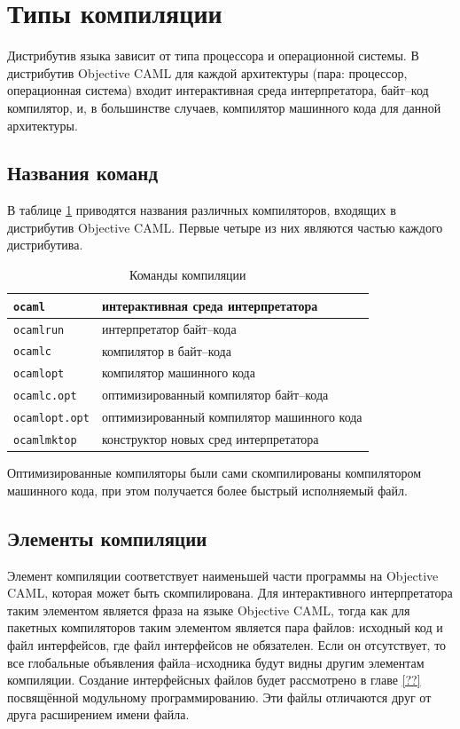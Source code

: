 \section{Типы компиляции}
\label{sec:compilation}

Дистрибутив языка зависит от типа процессора и операционной системы. В
дистрибутив Objective CAML для каждой архитектуры (пара: процессор, операционная
система) входит интерактивная среда интерпретатора, байт--код компилятор, и, в
большинстве случаев, компилятор машинного кода для данной архитектуры.

\subsection{Названия команд}
\label{subsec:command_names}

В таблице \ref{tbl:commands_for_compiling} приводятся названия различных
компиляторов, входящих в дистрибутив Objective CAML. Первые четыре из них
являются частью каждого дистрибутива.

\begin{table}
	\begin{tabular}{|l|l|}
	\hline
	\texttt{ocaml} & интерактивная среда интерпретатора \\
	\hline
	\texttt{ocamlrun} & интерпретатор байт--кода \\
	\hline
	\texttt{ocamlc} & компилятор в байт--кода \\
	\hline
	\texttt{ocamlopt} & компилятор машинного кода \\
	\hline
	\texttt{ocamlc.opt} & оптимизированный компилятор байт--кода \\
	\hline
	\texttt{ocamlopt.opt} & оптимизированный компилятор машинного кода \\
	\hline
	\texttt{ocamlmktop} & конструктор новых сред интерпретатора \\
	\hline
	\end{tabular}
	\caption{\label{tbl:commands_for_compiling}Команды
компиляции}
\end{table}

Оптимизированные компиляторы были сами скомпилированы компилятором машинного
кода, при этом получается более быстрый исполняемый файл.

\subsection{Элементы компиляции}

Элемент компиляции соответствует наименьшей части программы на Objective CAML,
которая может быть скомпилирована. Для интерактивного интерпретатора таким
элементом является фраза на языке Objective CAML, тогда как для пакетных
компиляторов таким элементом является пара файлов: исходный код и файл
интерфейсов, где файл интерфейсов не обязателен. Если он отсутствует, то все
глобальные объявления файла--исходника будут видны другим элементам компиляции.
Создание интерфейсных файлов будет рассмотрено в главе \ref{??} посвящённой
модульному программированию. Эти файлы отличаются друг от друга расширением
имени файла.

